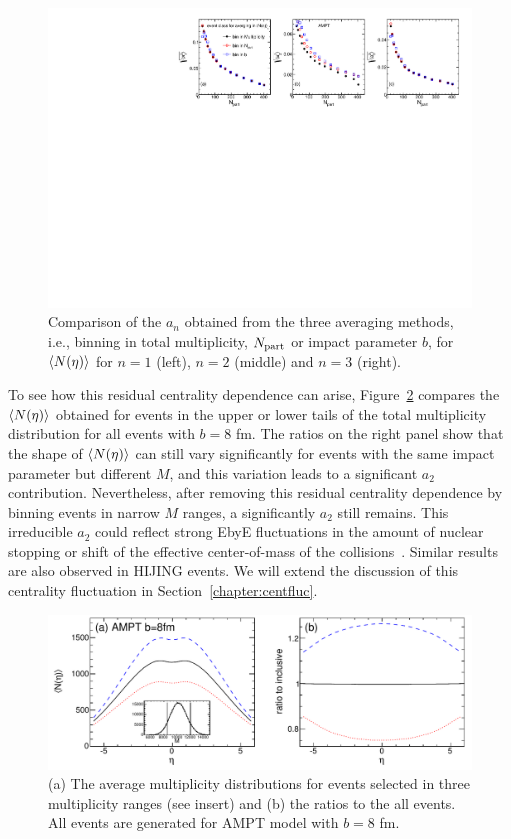 \begin{figure}[H]
\centering
\includegraphics[width=.95\linewidth]{figs/chapter_fbcorr/Model_an_cent.pdf}
\caption{Comparison of the $a_n$ obtained from the three averaging methods, i.e., binning in total multiplicity, $N_\text{part}$ or impact parameter $b$, for $\left\langle N(\eta)\right\rangle$ for $n=1$ (left), $n=2$ (middle) and $n=3$ (right).}
\label{fig:fbcorr_Model_an_cent}
\end{figure}

To see how this residual centrality dependence can arise, Figure~\ref{fig:fbcorr_Model_eg_cent} compares the $\left\langle N(\eta)\right\rangle$ obtained for events in the upper or lower tails of the total multiplicity distribution for all events with $b=8$ fm. The ratios on the right panel show that the shape of $\left\langle N(\eta)\right\rangle$ can still vary significantly for events with the same impact parameter but different $M$, and this variation leads to a significant $a_2$ contribution. Nevertheless, after removing this residual centrality dependence by binning events in narrow $M$ ranges, a significantly $a_2$ still remains. This irreducible $a_2$ could reflect strong EbyE fluctuations in the amount of nuclear stopping or shift of the effective center-of-mass of the collisions~\cite{Steinberg:2007fg, Vovchenko:2013viu}. Similar results are also observed in HIJING events. We will extend the discussion of this centrality fluctuation in Section~\ref{chapter:centfluc}.

\begin{figure}[H]
\centering
\includegraphics[width=.95\linewidth]{figs/chapter_fbcorr/Model_eg_cent.pdf}
\caption{(a) The average multiplicity distributions for events selected in three multiplicity ranges (see insert) and (b) the ratios to the all events. All events are generated for AMPT model with $b=8$ fm.}
\label{fig:fbcorr_Model_eg_cent}
\end{figure}



